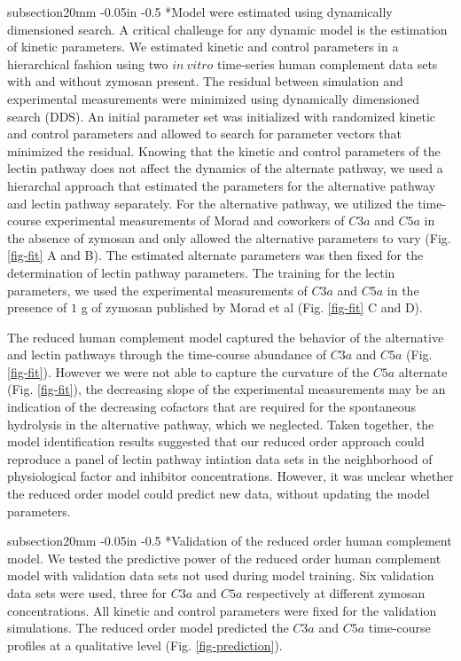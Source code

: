 \documentclass[12pt]{article}
\makeatletter
\renewcommand\subsection{\@startsection
	{subsection}{2}{0mm}
	{-0.05in}
	{-0.5\baselineskip}
	{\normalfont\normalsize\bfseries}}
\makeatother
\begin{document}
\subsection*{Model were estimated using dynamically dimensioned search.}
A critical challenge for any dynamic model is the estimation of kinetic parameters. We estimated
kinetic and control parameters in a hierarchical fashion using  two $in~vitro$ time-series human complement data sets with and without zymosan present. The residual between simulation and experimental measurements were minimized  using dynamically dimensioned search (DDS). An initial parameter set was initialized with randomized kinetic and control parameters and allowed to search for parameter vectors that minimized the residual. Knowing that the kinetic and control parameters of the lectin pathway does not affect the dynamics of the alternate pathway, we used a hierarchal approach that estimated the parameters for the alternative pathway and lectin pathway separately. For the alternative pathway, we utilized the time-course experimental measurements of Morad and coworkers \cite{morad2015time} of $C3a$ and $C5a$ in the absence of zymosan and only allowed the alternative parameters to vary (Fig. \ref{fig-fit} A and B). The estimated alternate parameters was then fixed for the determination of lectin pathway parameters. The training for the lectin parameters, we used the experimental measurements of $C3a$ and $C5a$ in the presence of $1$ g of zymosan published by Morad et al \cite{morad2015time} (Fig. \ref{fig-fit} C and D).

The reduced human complement model captured the behavior of the alternative and lectin pathways through the time-course abundance of $C3a$ and $C5a$ (Fig. \ref{fig-fit}). However we were not able to capture the curvature of the $C5a$ alternate (Fig. \ref{fig-fit}), the decreasing slope of the experimental measurements may be an indication of the decreasing cofactors that are required for the spontaneous hydrolysis in the alternative pathway, which we neglected.  Taken together, the model identification results suggested that our reduced order approach could reproduce a panel of lectin pathway intiation data sets in the neighborhood of physiological factor and inhibitor concentrations. However, it was unclear whether the reduced order model could predict new data, without updating the model parameters.

\subsection*{Validation of the reduced order human complement model.}
We tested the predictive power of the reduced order human complement model with validation data sets not used during model training. Six validation data sets were used, three for $C3a$ and $C5a$ respectively at different zymosan concentrations. All kinetic and control parameters were
fixed for the validation simulations. The reduced order model predicted the $C3a$ and $C5a$ time-course profiles at a qualitative level (Fig. \ref{fig-prediction}).
\end{document}
